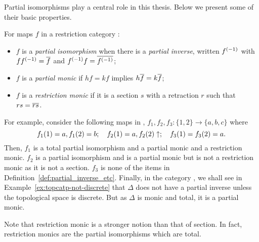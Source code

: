 Partial isomorphisms play a central role in this thesis. Below we present
some of their basic properties.

\begin{definition}\label{def:partial_inverse_etc}
  For maps $f$ in a restriction category \X:
  \begin{itemize}
    \item $f$ is a \emph{partial isomorphism} when there is a \emph{partial inverse}, written
      ${f}^{(-1)}$ with $f{f}^{(-1)} =\overline{f}$ and ${f}^{(-1)}f = \overline{{f}^{(-1)}}$;
    \item $f$ is a \emph{partial monic} if $h f = k f$ implies $h \overline{f} = k \overline{f}$;
    \item $f$ is a \emph{restriction monic} if it is a section $s$ with a retraction
      $r$ such that $r s = \overline{r s}$.
  \end{itemize}
\end{definition}

For example, consider the following maps in \Par, $f_1, f_2, f_3:\{1,2\} \to \{a,b,c\}$ where
\[
  f_1(1) = a, f_1(2)=b;\quad  f_2(1) = a, f_2(2) \uparrow;\quad    f_3(1) = f_3(2)=a.
\]
Then, $f_1$ is a total partial isomorphism and a partial monic and a restriction monic. $f_2$  is a
partial isomorphism and is a partial monic but is not a restriction monic as it is not a
section. $f_3$ is none of the items in Definition~\ref{def:partial_inverse_etc}. Finally, in the
category \topcatp, we shall see in Example~\ref{ex:topcatp-not-discrete} that $\Delta$ does not have
a partial inverse unless the topological space is discrete. But as $\Delta$ is monic and total, it
is a partial monic.

Note that restriction monic is a stronger notion than that of section. In fact, restriction monics
are the partial isomorphisms which are total.


